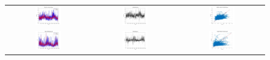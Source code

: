 \begin{figure}[ht!]
  \centering
  \begin{tabular}{ccc}
    \includegraphics[width=0.32\textwidth]{graphs/hybrid/96 hours/mean_fr/actual vs forecast.jpg} &
    \includegraphics[width=0.32\textwidth]{graphs/hybrid/96 hours/mean_fr/residuals.jpg} &
    \includegraphics[width=0.32\textwidth]{graphs/hybrid/96 hours/mean_fr/scatter plot.jpg} \\
    \includegraphics[width=0.32\textwidth]{graphs/hybrid/96 hours/s_wht/actual vs forecast.jpg} &
    \includegraphics[width=0.32\textwidth]{graphs/hybrid/96 hours/s_wht/residuals.jpg} &
    \includegraphics[width=0.32\textwidth]{graphs/hybrid/96 hours/s_wht/scatter plot.jpg} \\

\end{tabular}
\end{figure}
